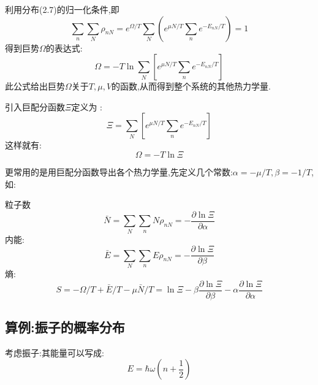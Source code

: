 利用分布(2.7)的归一化条件,即 
\[\sum_n\sum_N \rho_{nN}=e^{\Omega / T}\sum_N\left( e^{\mu N / T} \sum_n e^{-E_{nN} / T} \right) =1 \]
得到巨势$\Omega$的表达式:
\begin{equation}
  \Omega= -T \ln\sum_N\left[ e^{\mu N / T}\sum_ne^{-E_{nN} / T} \right] 
\end{equation}
此公式给出巨势$\Omega$关于$T,\mu , V$的函数,从而得到整个系统的其他热力学量.

引入巨配分函数$\Xi$定义为 :
\begin{equation}
  \Xi=\sum_N\left[ e^{\mu N / T}\sum_ne^{-E_{nN} / T} \right]
\end{equation}
这样就有:
\begin{equation}
  \Omega=-T\ln\Xi
\end{equation}


更常用的是用巨配分函数导出各个热力学量,先定义几个常数:$\alpha=-\mu /T,\beta=-1/T$,如:

粒子数\[\bar{N}=\sum_N \sum _nN\rho_{nN}=-\dfrac{\partial \ln \Xi}{\partial \alpha}\]
内能:\[\bar{E}=\sum_N \sum_n E \rho_{nN}=-\dfrac{\partial \ln \Xi}{\partial \beta}\]
熵:\[S = -\Omega/T+\bar{E}/T -\mu \bar{N} /T=\ln \Xi-\beta\dfrac{\partial \ln\Xi}{\partial \beta}-\alpha\dfrac{\partial \ln\Xi}{\partial \alpha}\]


\subsection{算例:振子的概率分布}
  考虑振子:其能量可以写成:
  \begin{equation}
    E= \hbar \omega (n+\frac{1}{2})
  \end{equation}
